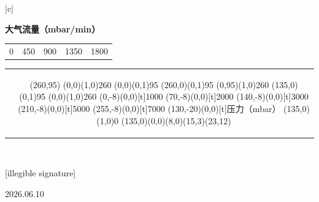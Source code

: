 \documentclass[UTF8,10pt,a4paper,fontset=fandol]{ctexart}
\newcommand{\fieldvalue}[1]{#1}
\newcommand{\handwritten}[1]{#1}
\begin{document}
\begin{center}
\begin{tabular}{|c|}
\hline
\begin{minipage}{0.72\linewidth}
\centering
\textbf{大气流量（mbar/min）}

\vspace{0.15em}
\begin{tabular}{c@{\hspace{1em}}c@{\hspace{1em}}c@{\hspace{1em}}c@{\hspace{1em}}c}
0 & 450 & 900 & 1350 & 1800
\end{tabular}

\vspace{1em}
\begin{tabular}{c|c}
\begin{minipage}{0.03\linewidth}\centering
\rotatebox{90}{大气流量（mbar/min）}
\end{minipage}
&
\begin{minipage}{0.62\linewidth}
\vspace{3em}
\begin{center}
\begin{picture}(260,95)
\put(0,0){\line(1,0){260}}
\put(0,0){\line(0,1){95}}
\put(260,0){\line(0,1){95}}
\put(0,95){\line(1,0){260}}
\put(135,0){\line(0,1){95}}
\put(0,0){\line(1,0){260}}
\put(0,-8){\makebox(0,0)[t]{1000}}
\put(70,-8){\makebox(0,0)[t]{2000}}
\put(140,-8){\makebox(0,0)[t]{3000}}
\put(210,-8){\makebox(0,0)[t]{5000}}
\put(255,-8){\makebox(0,0)[t]{7000}}
\put(130,-20){\makebox(0,0)[t]{压力（mbar）}}
\put(135,0){\line(1,0){0}}
\put(135,0){\curve(0,0)(8,0)(15,3)(23,12)}
\end{picture}
\end{center}
\end{minipage}
\end{tabular}
\end{minipage}
\\
\hline
\end{tabular}
\end{center}

\item[签名:] 
\fieldvalue{\handwritten{[illegible signature]}}

\item[签名日期:] 
\fieldvalue{\handwritten{2026.06.10}}
\end{document}
